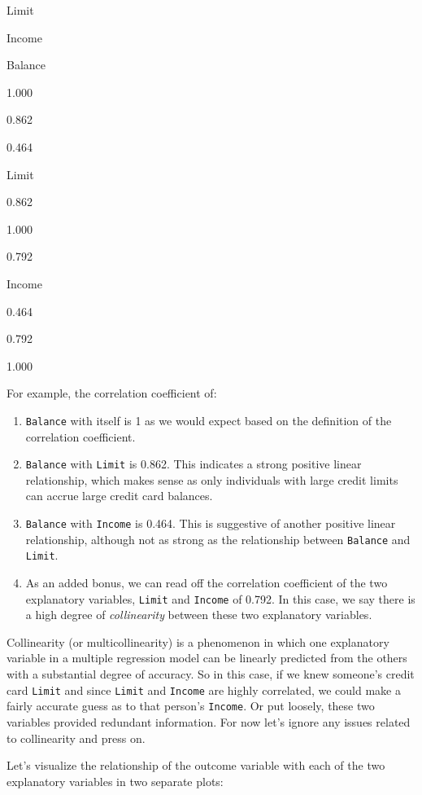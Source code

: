 \documentclass[12pt,]{krantz}
\providecommand{\tightlist}{%
  \setlength{\itemsep}{0pt}\setlength{\parskip}{0pt}}
\begin{document}
Limit

Income

Balance

1.000

0.862

0.464

Limit

0.862

1.000

0.792

Income

0.464

0.792

1.000

For example, the correlation coefficient of:

\begin{enumerate}
\def\labelenumi{\arabic{enumi}.}
\tightlist
\item
  \texttt{Balance} with itself is 1 as we would expect based on the
  definition of the correlation coefficient.
\item
  \texttt{Balance} with \texttt{Limit} is 0.862. This indicates a strong
  positive linear relationship, which makes sense as only individuals
  with large credit limits can accrue large credit card balances.
\item
  \texttt{Balance} with \texttt{Income} is 0.464. This is suggestive of
  another positive linear relationship, although not as strong as the
  relationship between \texttt{Balance} and \texttt{Limit}.
\item
  As an added bonus, we can read off the correlation coefficient of the
  two explanatory variables, \texttt{Limit} and \texttt{Income} of
  0.792. In this case, we say there is a high degree of
  \emph{collinearity} between these two explanatory variables.
\end{enumerate}

Collinearity (or multicollinearity) is a phenomenon in which one
explanatory variable in a multiple regression model can be linearly
predicted from the others with a substantial degree of accuracy. So in
this case, if we knew someone's credit card \texttt{Limit} and since
\texttt{Limit} and \texttt{Income} are highly correlated, we could make
a fairly accurate guess as to that person's \texttt{Income}. Or put
loosely, these two variables provided redundant information. For now
let's ignore any issues related to collinearity and press on.

Let's visualize the relationship of the outcome variable with each of
the two explanatory variables in two separate plots:
\end{document}
